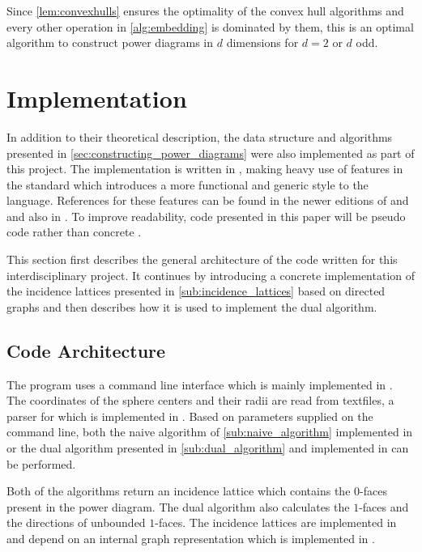 Since \cref{lem:convexhulls} ensures the optimality of the convex hull algorithms and every other operation in \cref{alg:embedding} is dominated by them, this is an optimal algorithm to construct power diagrams in $d$ dimensions for $d = 2$ or $d$ odd.

\section{Implementation}
\label{sec:implementation}
In addition to their theoretical description, the data structure and algorithms presented in \cref{sec:constructing_power_diagrams} were also implemented as part of this project.
The implementation is written in \CC, making heavy use of features in the \CCe standard which introduces a more functional and generic style to the language.
References for these features can be found in the newer editions of \cite{stroustrup1986c++} and \cite{stroustrup2014programming} and also in \cite{meyers2014effective}.
To improve readability, code presented in this paper will be pseudo code rather than concrete \CC.

This section first describes the general architecture of the code written for this interdisciplinary project.
It continues by introducing a concrete implementation of the incidence lattices presented in \cref{sub:incidence_lattices} based on directed graphs and then describes how it is used to implement the dual algorithm.

\subsection{Code Architecture}
\label{sub:code_architecture}
The program uses a command line interface which is mainly implemented in .
The coordinates of the sphere centers and their radii are read from textfiles, a parser for which is implemented in .
Based on parameters supplied on the command line, both the naive algorithm of \cref{sub:naive_algorithm} implemented in  or the dual algorithm presented in \cref{sub:dual_algorithm} and implemented in  can be performed.

Both of the algorithms return an incidence lattice which contains the $0$-faces present in the power diagram.
The dual algorithm also calculates the $1$-faces and the directions of unbounded $1$-faces.
The incidence lattices are implemented in  and depend on an internal graph representation which is implemented in .


